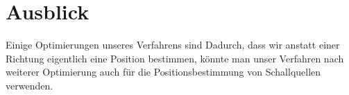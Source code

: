 \section{Ausblick} 
Einige Optimierungen unseres Verfahrens sind 
Dadurch, dass wir anstatt einer Richtung eigentlich eine Position bestimmen, könnte man unser Verfahren nach weiterer Optimierung auch für die Positionsbestimmung von Schallquellen verwenden.
